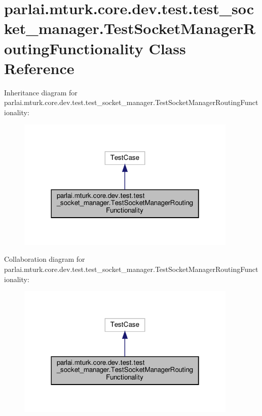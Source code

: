 \hypertarget{classparlai_1_1mturk_1_1core_1_1dev_1_1test_1_1test__socket__manager_1_1TestSocketManagerRoutingFunctionality}{}\section{parlai.\+mturk.\+core.\+dev.\+test.\+test\+\_\+socket\+\_\+manager.\+Test\+Socket\+Manager\+Routing\+Functionality Class Reference}
\label{classparlai_1_1mturk_1_1core_1_1dev_1_1test_1_1test__socket__manager_1_1TestSocketManagerRoutingFunctionality}


Inheritance diagram for parlai.\+mturk.\+core.\+dev.\+test.\+test\+\_\+socket\+\_\+manager.\+Test\+Socket\+Manager\+Routing\+Functionality\+:
\nopagebreak
\begin{figure}[H]
\begin{center}
\leavevmode
\includegraphics[width=298pt]{d2/d7e/classparlai_1_1mturk_1_1core_1_1dev_1_1test_1_1test__socket__manager_1_1TestSocketManagerRoutingFunctionality__inherit__graph}
\end{center}
\end{figure}


Collaboration diagram for parlai.\+mturk.\+core.\+dev.\+test.\+test\+\_\+socket\+\_\+manager.\+Test\+Socket\+Manager\+Routing\+Functionality\+:
\nopagebreak
\begin{figure}[H]
\begin{center}
\leavevmode
\includegraphics[width=298pt]{d8/d90/classparlai_1_1mturk_1_1core_1_1dev_1_1test_1_1test__socket__manager_1_1TestSocketManagerRoutingFunctionality__coll__graph}
\end{center}
\end{figure}
